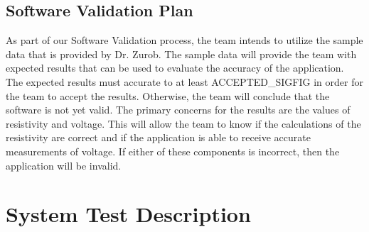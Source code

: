 \documentclass[12pt, titlepage]{article}
\begin{document}

\subsection{Software Validation Plan}

As part of our Software Validation process, the team intends to utilize the sample data that is provided by Dr. Zurob. The sample data will provide the team with expected results that can be used to evaluate the accuracy of the application. The expected results must accurate to at least ACCEPTED\_SIGFIG in order for the team to accept the results. Otherwise, the team will conclude that the software is not yet valid. The primary concerns for the results are the values of resistivity and voltage. This will allow the team to know if the calculations of the resistivity are correct and if the application is able to receive accurate measurements of voltage. If either of these components is incorrect, then the application will be invalid. 




\section{System Test Description}
	
\end{document}
